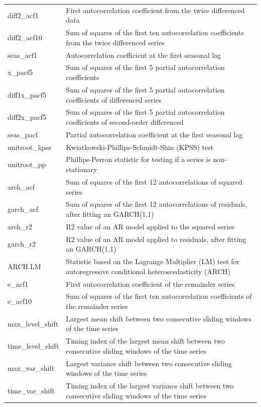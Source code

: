 \documentclass[preprint, 3p,
authoryear]{elsarticle} %
\begin{document}
\begin{table}[!h]
{\begin{tabular}[t]{ll}
diff2\_acf1 & First autocorrelation coefficient from the twice differenced data\\
diff2\_acf10 & Sum of squares of the first ten autocorrelation coefficients from the twice differenced series\\
seas\_acf1 & Autocorrelation coefficient at the first seasonal lag\\
x\_pacf5 & Sum of squares of the first 5 partial autocorrelation coefficients\\
diff1x\_pacf5 & Sum of squares of the first 5 partial autocorrelation coefficients of differenced series\\
diff2x\_pacf5 & Sum of squares of the first 5 partial autocorrelation coefficients of second-order differenced\\
seas\_pacf & Partial autocorrelation coefficient at the first seasonal lag\\
unitroot\_kpss & Kwiatkowski-Phillips-Schmidt-Shin (KPSS) test\\
unitroot\_pp & Phillips-Perron statistic for testing if a series is non-stationary\\
arch\_acf & Sum of squares of the first 12 autocorrelations of squared series\\
garch\_acf & Sum of squares of the first 12 autocorrelations of residuals, after fitting an GARCH(1,1)\\
arch\_r2 & R2 value of an AR model applied to the squared series\\
garch\_r2 & R2 value of an AR model applied to  residuals, after fitting an GARCH(1,1)\\
ARCH.LM & Statistic based on the Lagrange Multiplier (LM) test  for autoregressive conditional heteroscedasticity (ARCH)\\
e\_acf1 & First autocorrelation coefficient of the remainder series\\
e\_acf10 & Sum of squares of the first ten autocorrelation coefficients of the remainder series\\
max\_level\_shift & Largest mean shift between two consecutive sliding windows of the time series\\
time\_level\_shift & Timing index of the largest mean shift between two consecutive sliding windows of the time series\\
max\_var\_shift & Largest variance shift between two consecutive sliding windows of the time series\\
time\_var\_shift & Timing index of the largest variance shift between two consecutive sliding windows of the time series\\
\bottomrule
\end{tabular}}
\end{table}
\end{document}
